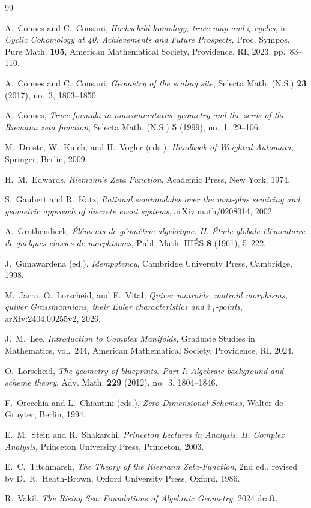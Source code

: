 \documentclass[11pt,a4paper]{article}
\numberwithin{equation}{section}
\theoremstyle{definition}
\theoremstyle{remark}
\begin{document}
\begin{thebibliography}{99}

A.~Connes and C.~Consani,
\emph{Hochschild homology, trace map and $\zeta$-cycles},
in \emph{Cyclic Cohomology at 40: Achievements and Future Prospects},
Proc. Sympos. Pure Math. \textbf{105}, American Mathematical Society, Providence, RI, 2023, pp.~83--110.

A.~Connes and C.~Consani,
\emph{Geometry of the scaling site},
Selecta Math. (N.S.) \textbf{23} (2017), no.~3, 1803--1850.

A.~Connes,
\emph{Trace formula in noncommutative geometry and the zeros of the Riemann zeta function},
Selecta Math. (N.S.) \textbf{5} (1999), no.~1, 29--106.

M.~Droste, W.~Kuich, and H.~Vogler (eds.),
\emph{Handbook of Weighted Automata},
Springer, Berlin, 2009.

H.~M.~Edwards,
\emph{Riemann's Zeta Function},
Academic Press, New York, 1974.

S.~Gaubert and R.~Katz,
\emph{Rational semimodules over the max-plus semiring and geometric approach of discrete event systems},
arXiv:math/0208014, 2002.

A.~Grothendieck,
\emph{\'El\'ements de g\'eom\'etrie alg\'ebrique. II. \'Etude globale \'el\'ementaire de quelques classes de morphismes},
Publ. Math. IH\'ES \textbf{8} (1961), 5--222.

J.~Gunawardena (ed.),
\emph{Idempotency},
Cambridge University Press, Cambridge, 1998.

M.~Jarra, O.~Lorscheid, and E.~Vital,
\emph{Quiver matroids, matroid morphisms, quiver Grassmannians, their Euler characteristics and $\mathbb F_1$-points},
arXiv:2404.09255v2, 2026.

J.~M.~Lee,
\emph{Introduction to Complex Manifolds},
Graduate Studies in Mathematics, vol.~244, American Mathematical Society, Providence, RI, 2024.

O.~Lorscheid,
\emph{The geometry of blueprints. Part I: Algebraic background and scheme theory},
Adv. Math. \textbf{229} (2012), no.~3, 1804--1846.

F.~Orecchia and L.~Chiantini (eds.),
\emph{Zero-Dimensional Schemes},
Walter de Gruyter, Berlin, 1994.

E.~M.~Stein and R.~Shakarchi,
\emph{Princeton Lectures in Analysis. II. Complex Analysis},
Princeton University Press, Princeton, 2003.

E.~C.~Titchmarsh,
\emph{The Theory of the Riemann Zeta-Function},
2nd ed., revised by D.~R.~Heath-Brown, Oxford University Press, Oxford, 1986.

R.~Vakil,
\emph{The Rising Sea: Foundations of Algebraic Geometry},
2024 draft.

\end{thebibliography}
\end{document}
